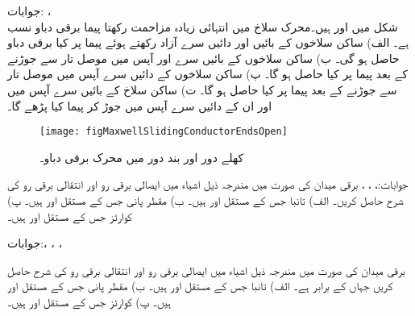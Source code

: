 جوابات: ، \\ 
شکل  میں  اور  ہیں۔محرک سلاخ میں انتہائی زیادہ مزاحمت رکھتا پیما برقی دباو  نسب ہے۔ الف) ساکن سلاخوں کے بائیں اور دائیں  سرے آزاد رکھتے ہوئے پیما پر کیا برقی دباو حاصل ہو گی۔ ب) ساکن سلاخوں کے بائیں سرے  اور  آپس میں موصل تار سے جوڑنے کے بعد پیما پر کیا حاصل ہو گا۔ پ) ساکن سلاخوں کے دائیں سرے آپس میں موصل تار سے جوڑنے کے بعد پیما پر کیا حاصل ہو گا۔ ت) ساکن سلاخ کے بائیں سرے آپس میں اور ان کے دائیں سرے آپس میں جوڑ کر پیما کیا پڑھے گا۔

\begin{figure}
\centering
\texttt{[image: figMaxwellSlidingConductorEndsOpen]}
\caption{کھلے دور اور بند دور میں محرک برقی دباو۔}
\label{شکل_میکس_ویل_سوال_کھلا_دور_بند_دور}
\end{figure}

جوابات:، ،  ، 
برقی میدان  کی صورت میں مندرجہ ذیل اشیاء میں ایصالی برقی رو اور انتقالی برقی رو کی شرح حاصل کریں۔ الف) تانبا جس کے مستقل  اور  ہیں۔ ب) مقطر پانی جس کے مستقل  اور  ہیں۔ پ)  کوارٹز جس کے مستقل  اور  ہیں۔

جوابات:، ، ، 

برقی میدان  کی صورت میں مندرجہ ذیل اشیاء میں ایصالی برقی رو اور انتقالی برقی رو کی شرح حاصل کریں جہاں  کے برابر ہے۔ الف) تانبا جس کے مستقل  اور  ہیں۔ ب) مقطر پانی جس کے مستقل  اور  ہیں۔ پ)  کوارٹز جس کے مستقل  اور  ہیں۔

